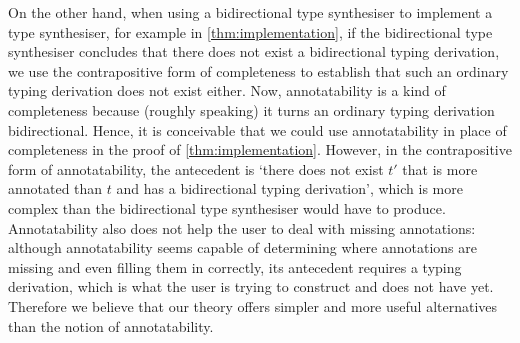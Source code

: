 On the other hand, when using a bidirectional type synthesiser to implement a type synthesiser, for example in \cref{thm:implementation}, if the bidirectional type synthesiser concludes that there does not exist a bidirectional typing derivation, we use the contrapositive form of completeness to establish that such an ordinary typing derivation does not exist either.
Now, annotatability is a kind of completeness because (roughly speaking) it turns an ordinary typing derivation bidirectional.
Hence, it is conceivable that we could use annotatability in place of completeness in the proof of \cref{thm:implementation}.
However, in the contrapositive form of annotatability, the antecedent is `there does not exist $t'$ that is more annotated than $t$ and has a bidirectional typing derivation', which is more complex than the bidirectional type synthesiser would have to produce.
Annotatability also does not help the user to deal with missing annotations: although annotatability seems capable of determining where annotations are missing and even filling them in correctly, its antecedent requires a typing derivation, which is what the user is trying to construct and does not have yet.
Therefore we believe that our theory offers simpler and more useful alternatives than the notion of annotatability.
